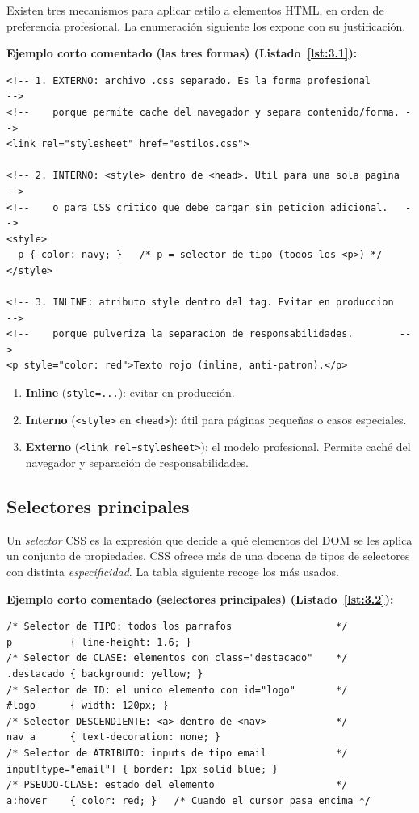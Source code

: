 Existen tres mecanismos para aplicar estilo a elementos HTML, en
orden de preferencia profesional. La enumeración siguiente los
expone con su justificación.

\textbf{Ejemplo corto comentado (las tres formas) (Listado~\ref{lst:3.1}):}
\begin{lstlisting}[language=HTML5,numbers=none,caption={Ejemplo de HTML},label=lst:3.1]
<!-- 1. EXTERNO: archivo .css separado. Es la forma profesional       -->
<!--    porque permite cache del navegador y separa contenido/forma. -->
<link rel="stylesheet" href="estilos.css">

<!-- 2. INTERNO: <style> dentro de <head>. Util para una sola pagina  -->
<!--    o para CSS critico que debe cargar sin peticion adicional.   -->
<style>
  p { color: navy; }   /* p = selector de tipo (todos los <p>) */
</style>

<!-- 3. INLINE: atributo style dentro del tag. Evitar en produccion   -->
<!--    porque pulveriza la separacion de responsabilidades.        -->
<p style="color: red">Texto rojo (inline, anti-patron).</p>
\end{lstlisting}


\begin{enumerate}
\item \textbf{Inline} (\texttt{style=...}): evitar en producción.
\item \textbf{Interno} (\texttt{<style>} en \texttt{<head>}): útil
para páginas pequeñas o casos especiales.
\item \textbf{Externo} (\texttt{<link rel=stylesheet>}): el modelo
profesional. Permite caché del navegador y separación de
responsabilidades.
\end{enumerate}

\subsection{Selectores principales}

Un \emph{selector} CSS es la expresión que decide a qué
elementos del DOM se les aplica un conjunto de propiedades. CSS
ofrece más de una docena de tipos de selectores con distinta
\emph{especificidad}. La tabla siguiente recoge los más usados.

\textbf{Ejemplo corto comentado (selectores principales) (Listado~\ref{lst:3.2}):}
\begin{lstlisting}[language=HTML5,numbers=none,caption={Ejemplo de HTML},label=lst:3.2]
/* Selector de TIPO: todos los parrafos                  */
p          { line-height: 1.6; }
/* Selector de CLASE: elementos con class="destacado"    */
.destacado { background: yellow; }
/* Selector de ID: el unico elemento con id="logo"       */
#logo      { width: 120px; }
/* Selector DESCENDIENTE: <a> dentro de <nav>            */
nav a      { text-decoration: none; }
/* Selector de ATRIBUTO: inputs de tipo email            */
input[type="email"] { border: 1px solid blue; }
/* PSEUDO-CLASE: estado del elemento                     */
a:hover    { color: red; }   /* Cuando el cursor pasa encima */
\end{lstlisting}


